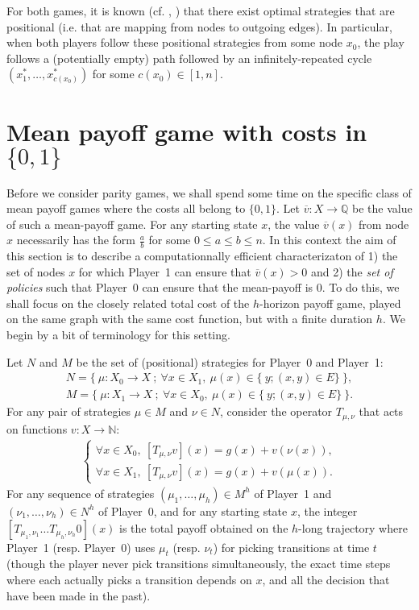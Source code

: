 \documentclass{article}
\def\N{\mathbb N}
\def\Q{\mathbb Q}
\def\v{\overline v}
\def\pa{Player~0}
\def\pb{Player~1}
\begin{document}
For both games, it is known (cf. \citet{zielonka98}, \citet{ehrenfeucht79}) that there exist optimal strategies that are positional (i.e. that are mapping from nodes to outgoing edges). In particular, when both players follow these positional strategies from some node $x_0$, the play follows a (potentially empty) path followed by an infinitely-repeated cycle $(x^*_1,\dots,x^*_{c(x_0)})$ for some $c(x_0) \in [1,n]$.


\section{Mean payoff game with costs in $\{0,1\}$}

Before we consider parity games, we shall spend some time on the specific class of mean payoff games where the costs all belong to $\{0,1\}$. Let $\v:X \to \Q$ be the value of such a mean-payoff game. For any starting state $x$, the value $\v(x)$ from node $x$ necessarily has the form $\frac{a}{b}$ for some $0 \le a \le b \le n$. In this context the aim of this section is to describe a computationnally efficient characterizaton of 1) the set of nodes $x$ for which \pb{ }can ensure that $\v(x)>0$ and 2) the \emph{set of policies} such that \pa{ }can ensure that the mean-payoff is $0$. To do this, we shall focus on the closely related total cost of the $h$-horizon payoff game, played on the same graph with the same cost function, but with a finite duration $h$. We begin by a bit of terminology for this setting.

Let $N$ and $M$ be the set of (positional) strategies for \pa{ }and \pb:
\begin{align}
  N = \{~ \mu:X_0 \to X ~;~ \forall x \in X_1,~ \mu(x) \in \{~ y;(x,y) \in E\} ~\},\\
  M = \{~ \mu:X_1 \to X ~;~ \forall x \in X_0,~ \mu(x) \in \{~ y;(x,y) \in E\} ~\}.
\end{align}
For any pair of strategies $\mu \in M$ and $\nu \in N$, consider the operator $T_{\mu,\nu}$ that acts on functions $v:X \to \N$:
\begin{align}
  \left\{\begin{array}{l}
  \forall x \in X_0,~ [T_{\mu,\nu}v](x) = g(x) + v(\nu(x)), \\
  \forall x \in X_1,~ [T_{\mu,\nu}v](x)= g(x) + v(\mu(x)).
  \end{array}\right.
\end{align}
For any sequence of strategies $(\mu_1,\dots,\mu_h) \in M^h$ of \pb{ }and $(\nu_1,\dots,\nu_h) \in N^h$ of \pa, and for any starting state $x$, the integer $[T_{\mu_1,\nu_1} \dots T_{\mu_h,\nu_h}0](x)$ is the total payoff obtained on the $h$-long trajectory where \pb{ } (resp. \pa) uses $\mu_t$ (resp. $\nu_t$) for picking transitions at time $t$ (though the player never pick transitions simultaneously, the exact time steps where each actually picks a transition depends on $x$, and all the decision that have been made in the past).
\end{document}
